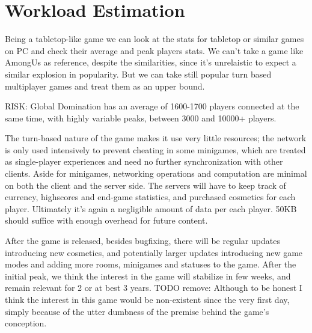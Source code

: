 \section{Workload Estimation}
Being a tabletop-like game we can look at the stats for tabletop or similar games on PC and check their average and peak players stats. 
We can't take a game like AmongUs as reference, despite the similarities, since it's unrelaistic to expect a similar explosion in popularity. But we can take still popular turn based multiplayer games and treat them as an upper bound.

RISK: Global Domination has an average of 1600-1700 players connected at the same time, with highly variable peaks, between 3000 and 10000+ players.

The turn-based nature of the game makes it use very little resources; the network is only used intensively to prevent cheating in some minigames, which are treated as single-player experiences and need no further synchronization with other clients.
Aside for minigames, networking operations and computation are minimal on both the client and the server side.
The servers will have to keep track of currency, highscores and end-game statistics, and purchased cosmetics for each player. Ultimately it's again a negligible amount of data per each player. 50KB should suffice with enough overhead for future content.

After the game is released, besides bugfixing, there will be regular updates introducing new cosmetics, and potentially larger updates introducing new game modes and adding more rooms, minigames and statuses to the game. After the initial peak, we think the interest in the game will stabilize in few weeks, and remain relevant for 2 or at best 3 years. TODO remove: Although to be honest I think the interest in this game would be non-existent since the very first day, simply because of the utter dumbness of the premise behind the game's conception. 
\pagebreak 